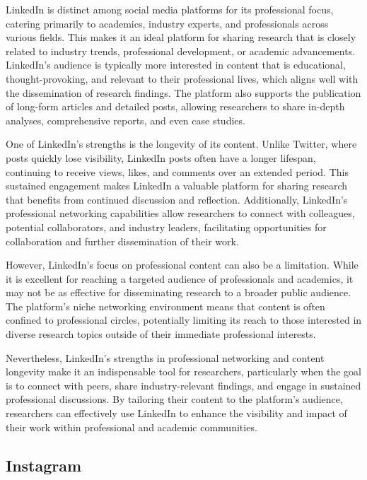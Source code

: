 \documentclass[
]{book}
\begin{document}
LinkedIn is distinct among social media platforms for its professional focus, catering primarily to academics, industry experts, and professionals across various fields. This makes it an ideal platform for sharing research that is closely related to industry trends, professional development, or academic advancements. LinkedIn's audience is typically more interested in content that is educational, thought-provoking, and relevant to their professional lives, which aligns well with the dissemination of research findings. The platform also supports the publication of long-form articles and detailed posts, allowing researchers to share in-depth analyses, comprehensive reports, and even case studies.

One of LinkedIn's strengths is the longevity of its content. Unlike Twitter, where posts quickly lose visibility, LinkedIn posts often have a longer lifespan, continuing to receive views, likes, and comments over an extended period. This sustained engagement makes LinkedIn a valuable platform for sharing research that benefits from continued discussion and reflection. Additionally, LinkedIn's professional networking capabilities allow researchers to connect with colleagues, potential collaborators, and industry leaders, facilitating opportunities for collaboration and further dissemination of their work.

However, LinkedIn's focus on professional content can also be a limitation. While it is excellent for reaching a targeted audience of professionals and academics, it may not be as effective for disseminating research to a broader public audience. The platform's niche networking environment means that content is often confined to professional circles, potentially limiting its reach to those interested in diverse research topics outside of their immediate professional interests.

Nevertheless, LinkedIn's strengths in professional networking and content longevity make it an indispensable tool for researchers, particularly when the goal is to connect with peers, share industry-relevant findings, and engage in sustained professional discussions. By tailoring their content to the platform's audience, researchers can effectively use LinkedIn to enhance the visibility and impact of their work within professional and academic communities.

\subsection*{Instagram}\label{instagram}
\end{document}

